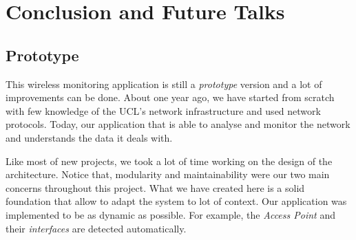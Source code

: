 
\chapter{Conclusion and Future Talks} %

\label{Chapter 7} %


\section{Prototype}
This wireless monitoring application is still a \emph{prototype} version and a lot of improvements can be done. About one year ago, we have started from scratch with few knowledge of the UCL's network infrastructure and used network protocols. Today, our application that is able to analyse and monitor the network and understands the data it deals with. 

Like most of new projects, we took a lot of time working on the design of the architecture. Notice that, modularity and maintainability were our two main concerns throughout this project. What we have created here is a solid foundation that allow to adapt the system to lot of context. Our application was implemented to be as dynamic as possible. For example, the \emph{Access Point} and their \emph{interfaces} are detected automatically.



